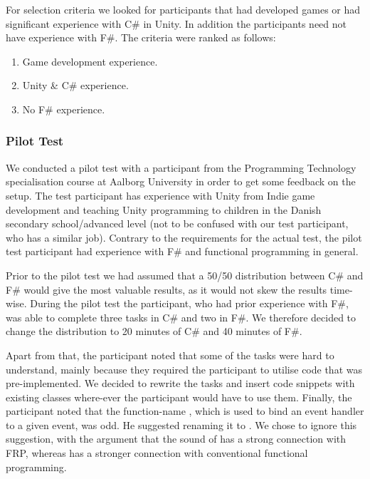 For selection criteria we looked for participants that had developed games or had significant experience with C\# in Unity. In addition the participants need not have experience with F\#. The criteria were ranked as follows:
\begin{enumerate}
	\item Game development experience.
	\item Unity \& C\# experience.
	\item No F\# experience.
\end{enumerate}

\subsubsection{Pilot Test}
We conducted a pilot test with a participant from the Programming Technology specialisation course at Aalborg University in order to get some feedback on the setup. The test participant has experience with Unity from Indie game development and teaching Unity programming to children in the Danish secondary school/advanced level (not to be confused with our test participant, who has a similar job). Contrary to the requirements for the actual test, the pilot test participant had experience with F\# and functional programming in general.

Prior to the pilot test we had assumed that a 50/50 distribution between C\# and F\# would give the most valuable results, as it would not skew the results time-wise. During the pilot test the participant, who had prior experience with F\#, was able to complete three tasks in C\# and two in F\#. We therefore decided to change the distribution to 20 minutes of C\# and 40 minutes of F\#.

Apart from that, the participant noted that some of the tasks were hard to understand, mainly because they required the participant to utilise code that was pre-implemented. We decided to rewrite the tasks and insert code snippets with existing classes where-ever the participant would have to use them. Finally, the participant noted that the function-name , which is used to bind an event handler to a given event, was odd. He suggested renaming it to . We chose to ignore this suggestion, with the argument that the sound of  has a strong connection with \gls{FRP}, whereas  has a stronger connection with conventional functional programming.
